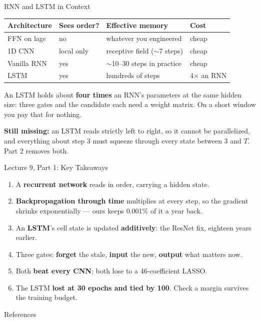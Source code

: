 \documentclass[aspectratio=169, 11pt]{beamer}
\begin{document}
\begin{frame}{RNN and LSTM in Context}
  \begin{center}
    {\small
    \begin{tabular}{llll}
      \toprule
      \textbf{Architecture} & \textbf{Sees order?} & \textbf{Effective memory} & \textbf{Cost} \\
      \midrule
      FFN on lags & no & whatever you engineered & cheap \\
      1D CNN & local only & receptive field ($\sim$7 steps) & cheap \\
      Vanilla RNN & yes & $\sim$10--30 steps in practice & cheap \\
      LSTM & yes & hundreds of steps & 4$\times$ an RNN \\
      \bottomrule
    \end{tabular}
    }
  \end{center}

  \vspace{0.15cm}
  An LSTM holds about \textbf{four times} an RNN's parameters at the same hidden size: three gates
  and the candidate each need a weight matrix. On a short window you pay that for nothing.

  \vspace{0.15cm}
  \textbf{Still missing:} an LSTM reads strictly left to right, so it cannot be parallelized, and
  everything about step 3 must squeeze through every state between 3 and $T$. Part 2 removes
  both.
\end{frame}

\begin{frame}{Lecture 9, Part 1: Key Takeaways}
  \begin{keybox}
    {\small
    \begin{enumerate}\itemsep3pt
      \item A \textbf{recurrent network} reads in order, carrying a hidden state.
      \item \textbf{Backpropagation through time} multiplies at every step, so the gradient
            shrinks exponentially --- ours keeps 0.001\% of it a year back.
      \item An \textbf{LSTM}'s cell state is updated \textbf{additively}: the ResNet fix,
            eighteen years earlier.
      \item Three gates: \textbf{forget} the stale, \textbf{input} the new, \textbf{output} what
            matters now.
      \item Both \textbf{beat every CNN}; both lose to a 46-coefficient LASSO.
      \item The LSTM \textbf{lost at 30 epochs and tied by 100}. Check a margin survives the training
            budget.
    \end{enumerate}
    }
  \end{keybox}
\end{frame}

\begin{frame}[allowframebreaks]{References}
  \printbibliography[heading=none]
\end{frame}
\end{document}
